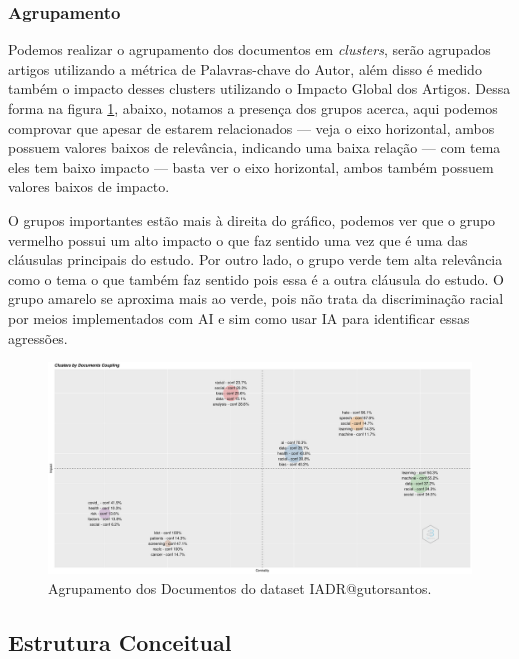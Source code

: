 \subsubsection{Agrupamento}

Podemos realizar o agrupamento dos documentos em \textit{clusters}, serão agrupados artigos utilizando a métrica de Palavras-chave do Autor, além disso é medido também o impacto desses clusters utilizando o Impacto Global dos Artigos. Dessa forma na figura \ref{fig:IADR@gutorsantos:Coupling}, abaixo, notamos a presença dos grupos acerca, aqui podemos comprovar que apesar de estarem relacionados --- veja o eixo horizontal, ambos possuem valores baixos de relevância, indicando uma baixa relação --- com tema eles tem baixo impacto --- basta ver o eixo horizontal, ambos também possuem valores baixos de impacto.

O grupos importantes estão mais à direita do gráfico, podemos ver que o grupo vermelho possui um alto impacto o que faz sentido uma vez que é uma das cláusulas principais do estudo. Por outro lado, o grupo verde tem alta relevância como o tema o que também faz sentido pois essa é a outra cláusula do estudo. O grupo amarelo se aproxima mais ao verde, pois não trata da discriminação racial por meios implementados com AI e sim como usar IA para identificar essas agressões. 

\begin{figure}
    \centering
\includegraphics[angle=0,width=1\textwidth]{experiments/gutorsantos/AnaliseBibliometrica/IAeDiscriminacao/imgs/CouplingMap-2022-02-09.png}
    \caption{Agrupamento dos Documentos do dataset IADR@gutorsantos.}
    \label{fig:IADR@gutorsantos:Coupling}
\end{figure}


\subsection{Estrutura Conceitual}

